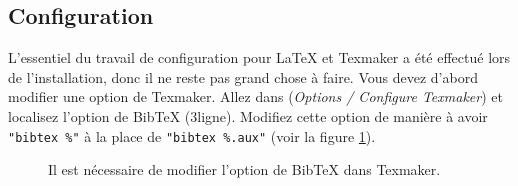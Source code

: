 \documentclass{ceri}
\begin{document}
\subsection{Configuration}
\label{sec:configuration}
L'essentiel du travail de configuration pour \LaTeX{} et Texmaker a été effectué lors de l'installation, donc il ne reste pas grand chose à faire. Vous devez d'abord modifier une option de Texmaker. Allez dans (\textit{Options / Configure Texmaker}) et localisez l'option de BibTeX (3\ieme ligne). Modifiez cette option de manière à avoir \texttt{"bibtex \%"} à la place de \texttt{"bibtex \%.aux"} (voir la figure \ref{fig:bibtex}).

\begin{figure}[htb]
	\centering
	\caption{Il est nécessaire de modifier l'option de BibTeX dans Texmaker.}
	\label{fig:bibtex}
\end{figure}
\end{document}
